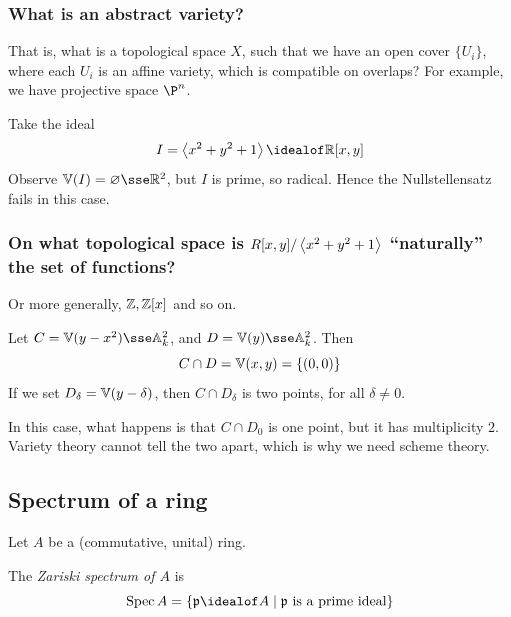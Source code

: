 \documentclass{article}
\begin{document}
\subsubsection*{What is an abstract variety?}

That is, what is a topological space \(X\), such that we have an open cover \(\{U_i\}\), where each \(U_i\) is an affine variety, which is compatible on overlaps? For example, we have projective space \(\P^n\).

\begin{example}
     Take the ideal
    \[I = \inner{x^2 + y^2 + 1} \idealof \R[x, y]\]
    Observe \(\van(I) = \emptyset \sse \R^2\), but \(I\) is prime, so radical. Hence the Nullstellensatz fails in this case.
\end{example}

\subsubsection*{On what topological space is \(R[x, y]/\left\langle x^2 + y^2 + 1 \right\rangle\) ``naturally'' the set of functions?}

Or more generally, \(\mathbb{Z}, \mathbb{Z}[x]\) and so on.

\begin{example}
    Let \(C = \van(y - x^2) \sse \aff k 2\), and \(D = \van(y) \sse \aff k 2\). Then
    \[C \cap D = \mathbb{V}(x, y) = \left\{(0, 0)\right\}\]
    If we set \(D_\delta = \mathbb{V}(y - \delta)\), then \(C \cap D_\delta\) is two points, for all \(\delta \ne 0\).
\end{example}

\begin{addendum}
    In this case, what happens is that \(C \cap D_0\) is one point, but it has multiplicity \(2\). Variety theory cannot tell the two apart, which is why we need scheme theory.
\end{addendum}

\lec

\subsection{Spectrum of a ring}

Let \(A\) be a (commutative, unital) ring.

\begin{definition}
     The \emph{Zariski spectrum of \(A\)} is
    \[\Spec A = \left\{\mfp \idealof A \mid \mfp \text{ is a prime ideal}\right\}\]
\end{definition}
\end{document}
